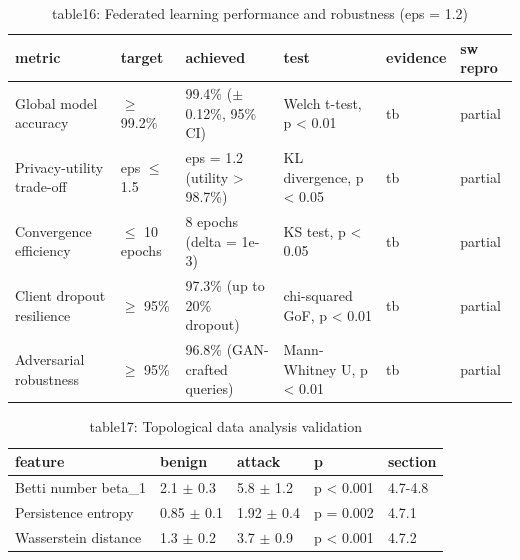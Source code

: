 \begin{table}[ht]
\centering
\small
\caption{table16: Federated learning performance and robustness (eps = 1.2)}
\label{tab:v2:table16}
\begin{tabular}{llllll}
\toprule
metric & target & achieved & test & evidence & sw repro \\
\midrule
Global model accuracy & $\geq$ 99.2\% & 99.4\% ($\pm$0.12\%, 95\% CI) & Welch t-test, p < 0.01 & tb & partial \\
Privacy-utility trade-off & eps $\leq$ 1.5 & eps = 1.2 (utility > 98.7\%) & KL divergence, p < 0.05 & tb & partial \\
Convergence efficiency & $\leq$ 10 epochs & 8 epochs (delta = 1e-3) & KS test, p < 0.05 & tb & partial \\
Client dropout resilience & $\geq$ 95\% & 97.3\% (up to 20\% dropout) & chi-squared GoF, p < 0.01 & tb & partial \\
Adversarial robustness & $\geq$ 95\% & 96.8\% (GAN-crafted queries) & Mann-Whitney U, p < 0.01 & tb & partial \\
\bottomrule
\end{tabular}
\end{table}

\begin{table}[ht]
\centering
\small
\caption{table17: Topological data analysis validation}
\label{tab:v2:table17}
\begin{tabular}{lllll}
\toprule
feature & benign & attack & p & section \\
\midrule
Betti number beta\_1 & 2.1 $\pm$ 0.3 & 5.8 $\pm$ 1.2 & p < 0.001 & 4.7-4.8 \\
Persistence entropy & 0.85 $\pm$ 0.1 & 1.92 $\pm$ 0.4 & p = 0.002 & 4.7.1 \\
Wasserstein distance & 1.3 $\pm$ 0.2 & 3.7 $\pm$ 0.9 & p < 0.001 & 4.7.2 \\
\bottomrule
\end{tabular}
\end{table}

